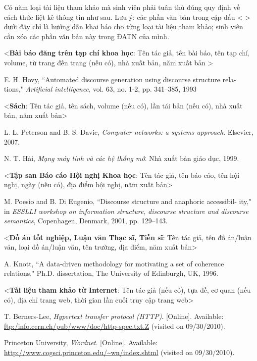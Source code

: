 \documentclass[../Main.tex]{subfiles}
\begin{document}
Có năm loại tài liệu tham khảo mà sinh viên phải tuân thủ đúng quy định về cách thức liệt kê thông tin như sau. Lưu ý: các phần văn bản trong cặp dấu < > dưới đây chỉ là hướng dẫn khai báo cho từng loại tài liệu tham khảo; sinh viên cần xóa các phần văn bản này trong ĐATN của mình.

<\textbf{Bài báo đăng trên tạp chí khoa học}: Tên tác giả, tên bài báo, tên tạp chí, volume, từ trang đến trang (nếu có), nhà xuất bản, năm xuất bản >



\cite{hovy1993automated} E. H. Hovy, ``Automated discourse generation using discourse structure rela-
tions," \textit{Artificial intelligence}, vol. 63, no. 1-2, pp. 341–385, 1993

<\textbf{Sách}: Tên tác giả, tên sách, volume (nếu có), lần tái bản (nếu có), nhà xuất bản, năm xuất bản>

\cite{peterson2007computer}	L. L. Peterson and B. S. Davie, \textit{Computer networks: a systems approach}. Elsevier, 2007.

\cite{NguyenThucHai}	N. T. Hải, \textit{Mạng máy tính và các hệ thống mở}. Nhà xuất bản giáo dục, 1999. 

<\textbf{Tập san Báo cáo Hội nghị Khoa học}: Tên tác giả, tên báo cáo, tên hội nghị, ngày (nếu có), địa điểm hội nghị, năm xuất bản>

\cite{poesio2001discourse}	M. Poesio and B. Di Eugenio, ``Discourse structure and anaphoric accessibil-
ity," in \textit{ESSLLI workshop on information structure, discourse structure and
discourse semantics}, Copenhagen, Denmark, 2001, pp. 129–143.

<\textbf{Đồ án tốt nghiệp, Luận văn Thạc sĩ, Tiến sĩ}: Tên tác giả, tên đồ án/luận văn, loại đồ án/luận văn, tên trường, địa điểm, năm xuất bản>

\cite{knott1996data}	A. Knott, ``A data-driven methodology for motivating a set of coherence relations," Ph.D. dissertation, The University of Edinburgh, UK, 1996.

<\textbf{Tài liệu tham khảo từ Internet}: Tên tác giả (nếu có), tựa đề, cơ quan (nếu có), địa chỉ trang web, thời gian lần cuối truy cập trang web>

\cite{BernersTim}	T. Berners-Lee, \textit{Hypertext transfer protocol (HTTP)}. [Online]. Available: \url{ftp:/info.cern.ch/pub/www/doc/http-spec.txt.Z} (visited on
09/30/2010).

\cite{LectureA} Princeton University, \textit{Wordnet}. [Online]. Available: \url{http://www.cogsci.princeton.edu/~wn/index.shtml} (visited on 09/30/2010).
\end{document}
